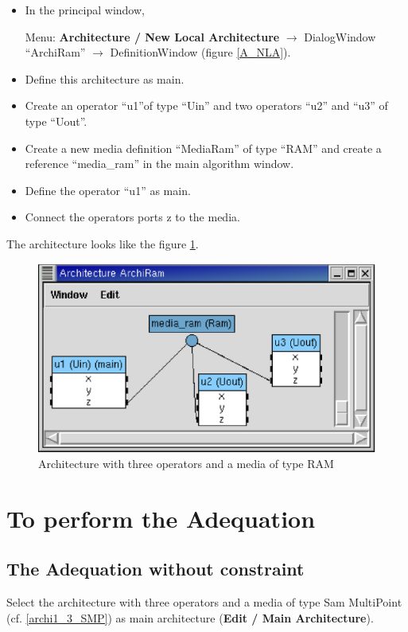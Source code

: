 \documentclass[a4paper,twoside]{report}
\begin{document}
\begin{itemize}
\item In the principal window, 

Menu: \textbf{Architecture / New Local Architecture} $\rightarrow$
DialogWindow ``ArchiRam'' $\rightarrow$ DefinitionWindow (figure
\ref{A_NLA}).

\item Define this architecture as main.

\item Create an operator ``u1''of type ``Uin'' and two operators ``u2'' and
``u3'' of type ``Uout''.
\item Create a new media definition ``MediaRam'' of type ``RAM'' and create a reference ``media\_ram'' in the main algorithm
window.
\item Define the operator ``u1'' as main.
\item Connect the operators ports z to the media.
\end{itemize}

The architecture looks like the figure \ref{archi1_4}.

\begin{figure}[htbp]
  \begin{center} 
        \includegraphics[width=0.6\linewidth]{architecture_ex1_3u_RAM.eps}
  \end{center} 
\caption{Architecture with three operators and a media of type RAM}
\label{archi1_4}
\end{figure}

\section{To perform the Adequation}
\subsection{The Adequation without constraint}
Select the architecture with three operators and a media of type Sam MultiPoint
(cf. \ref{archi1_3_SMP}) as main architecture (\textbf{Edit / Main Architecture}).
\end{document}
